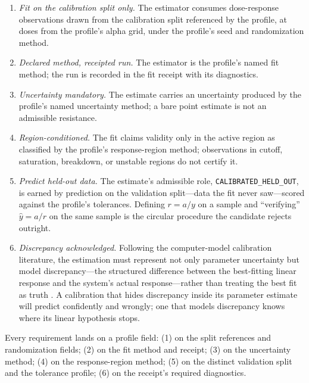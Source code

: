 \begin{enumerate}
\item \emph{Fit on the calibration split only.} The estimator consumes
dose-response observations drawn from the calibration split referenced by
the profile, at doses from the profile's alpha grid, under the profile's
seed and randomization method.
\item \emph{Declared method, receipted run.} The estimator is the profile's
named fit method; the run is recorded in the fit receipt with its
diagnostics.
\item \emph{Uncertainty mandatory.} The estimate carries an uncertainty
produced by the profile's named uncertainty method; a bare point estimate is
not an admissible resistance.
\item \emph{Region-conditioned.} The fit claims validity only in the active
region as classified by the profile's response-region method; observations
in cutoff, saturation, breakdown, or unstable regions do not certify it.
\item \emph{Predict held-out data.} The estimate's admissible role,
\texttt{CALIBRATED\_HELD\_OUT}, is earned by prediction on the validation
split---data the fit never saw---scored against the profile's tolerances.
Defining $r = a/y$ on a sample and ``verifying'' $\hat y = a/r$ on the same
sample is the circular procedure the candidate rejects outright.
\item \emph{Discrepancy acknowledged.} Following the computer-model
calibration literature, the estimation must represent not only parameter
uncertainty but model discrepancy---the structured difference between the
best-fitting linear response and the system's actual response---rather than
treating the best fit as truth \cite{kennedyohagan}. A calibration that
hides discrepancy inside its parameter estimate will predict confidently
and wrongly; one that models discrepancy knows where its linear hypothesis
stops.
\end{enumerate}

Every requirement lands on a profile field: (1) on the split references and
randomization fields; (2) on the fit method and receipt; (3) on the
uncertainty method; (4) on the response-region method; (5) on the distinct
validation split and the tolerance profile; (6) on the receipt's required
diagnostics.

